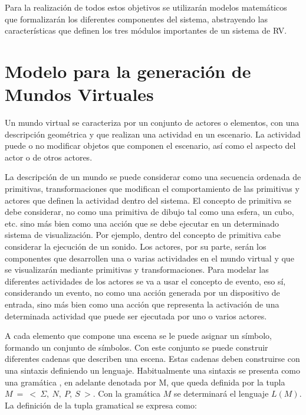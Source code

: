 \documentclass{egpubl}
\begin{document}
Para la realizaci\'on de todos estos objetivos se utilizar\'an modelos
matem\'aticos que formalizar\'an los diferentes componentes del
sistema, abstrayendo las caracter\'isticas que definen los tres
m\'odulos importantes de un sistema de RV. 


\section{Modelo para la generaci\'on de Mundos Virtuales
\label{sec:modelo}}

Un mundo virtual se caracteriza por un conjunto de actores o elementos,
con una descripci\'on geom\'etrica y que realizan una actividad en un
escenario. La actividad puede o no modificar objetos que componen el
escenario, as\'i como el aspecto del actor o de otros actores.

La descripci\'on de un mundo se puede
considerar como una secuencia ordenada de primitivas, transformaciones
que modifican el comportamiento de las primitivas y actores que definen
la actividad dentro del sistema. El concepto de primitiva se debe
considerar, no como una primitiva de dibujo tal como una esfera, un
cubo, etc. sino m\'as bien como una acci\'on que se debe ejecutar en
un determinado sistema de visualizaci\'on. Por ejemplo, dentro del
concepto de primitiva cabe considerar la ejecuci\'on de un sonido. Los
actores, por su parte, ser\'an los componentes que desarrollen una o
varias actividades en el mundo virtual y que se visualizar\'an mediante
primitivas y transformaciones. Para modelar las diferentes actividades
de los actores se va a usar el concepto de evento, eso s\'i,
considerando un evento, no como una acci\'on generada por un
dispositivo de entrada, sino m\'as bien como una acci\'on que
representa la activaci\'on de una determinada actividad que puede ser 
ejecutada por uno o varios actores.

A cada elemento que compone una
escena se le puede asignar un s\'imbolo, formando un conjunto de
s\'imbolos. Con este conjunto se puede construir diferentes cadenas que
describen una escena. Estas cadenas
deben construirse con una sintaxis
definiendo un lenguaje. Habitualmente una sintaxis se presenta como una
gram\'atica \cite{Davis1994}, en adelante denotada por
M, que queda definida por la tupla $M~=~<~\Sigma,~N,~P,~S~>$. 
Con la gram\'atica $M$ se determinar\'a el lenguaje
$L(M)$. La definici\'on de la tupla gramatical se expresa como:
\end{document}
